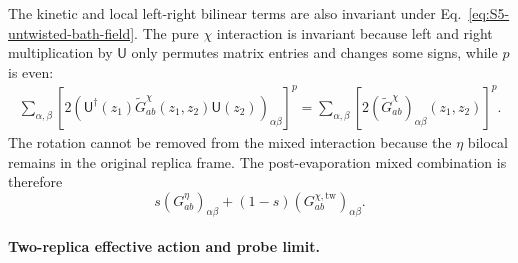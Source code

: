 \documentclass[11pt,a4paper]{article}
\begin{document}
The kinetic and local left-right bilinear terms are also invariant under
Eq.~\eqref{eq:S5-untwisted-bath-field}. The pure \(\chi\) interaction is
invariant because left and right multiplication by \(\mathsf U\) only
permutes matrix entries and changes some signs, while \(p\) is even:
\begin{equation}
\begin{aligned}
  \sum_{\alpha,\beta}
  \left[
  2\left(
  \mathsf U^\dagger(z_1)
  \widetilde G^\chi_{ab}(z_1,z_2)
  \mathsf U(z_2)
  \right)_{\alpha\beta}
  \right]^p
  =
  \sum_{\alpha,\beta}
  \left[
  2(\widetilde G^\chi_{ab})_{\alpha\beta}(z_1,z_2)
  \right]^p .
\end{aligned}
\label{eq:S5-pure-bath-invariance}
\end{equation}
The rotation cannot be removed from the mixed interaction because the
\(\eta\) bilocal remains in the original replica frame. The
post-evaporation mixed combination is therefore
\begin{equation}
  s(G^\eta_{ab})_{\alpha\beta}
  +
  (1-s)
  (G^{\chi,\mathrm{tw}}_{ab})_{\alpha\beta}.
\label{eq:S5-mixed-bilocal}
\end{equation}

\paragraph*{Two-replica effective action and probe limit.}
\end{document}
